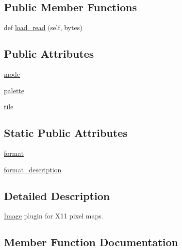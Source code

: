 \subsection*{Public Member Functions}
\begin{DoxyCompactItemize}
\item 
def \hyperlink{classPIL_1_1XpmImagePlugin_1_1XpmImageFile_ac1603c2638e73bb585f324d4ab38da18}{load\+\_\+read} (self, bytes)
\end{DoxyCompactItemize}
\subsection*{Public Attributes}
\begin{DoxyCompactItemize}
\item 
\hyperlink{classPIL_1_1XpmImagePlugin_1_1XpmImageFile_ab08b7f823df59a98a089394cdd9434b3}{mode}
\item 
\hyperlink{classPIL_1_1XpmImagePlugin_1_1XpmImageFile_a2585de29f12dfbb2d18c19db3aa02939}{palette}
\item 
\hyperlink{classPIL_1_1XpmImagePlugin_1_1XpmImageFile_af8aaf4f13d9c4b2dbb959c909cfc2e04}{tile}
\end{DoxyCompactItemize}
\subsection*{Static Public Attributes}
\begin{DoxyCompactItemize}
\item 
\hyperlink{classPIL_1_1XpmImagePlugin_1_1XpmImageFile_a9c4ec6c4e70b9446bdfbea63ed2715c1}{format}
\item 
\hyperlink{classPIL_1_1XpmImagePlugin_1_1XpmImageFile_acc90e782c55a3ca561562822ed70db46}{format\+\_\+description}
\end{DoxyCompactItemize}


\subsection{Detailed Description}
\hyperlink{namespacePIL_1_1Image}{Image} plugin for X11 pixel maps. 



\subsection{Member Function Documentation}
\mbox{\label{classPIL_1_1XpmImagePlugin_1_1XpmImageFile_ac1603c2638e73bb585f324d4ab38da18}} 
